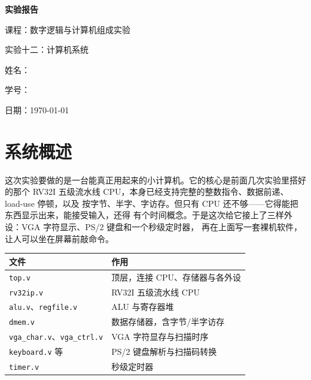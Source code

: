 \documentclass[12pt, a4paper]{ctexart}
\begin{document}
\begin{titlepage}
    \centering
    \vspace*{5cm}
    {\Huge\bfseries 实验报告\par}
    \vspace{2cm}
    {\Large 课程：数字逻辑与计算机组成实验\par}
    \vspace{1cm}
    {\Large 实验十二：计算机系统\par}
    \vspace{4cm}
    {\large 姓名：\underline{}\par}
    \vspace{1cm}
    {\large 学号：\underline{}\par}
    \vspace{1cm}
    {\large 日期：\today\par}
\end{titlepage}

\tableofcontents
\newpage

\section{系统概述}

这次实验要做的是一台能真正用起来的小计算机。它的核心是前面几次实验里搭好的那个
RV32I 五级流水线 CPU，本身已经支持完整的整数指令、数据前递、load-use 停顿，以及
按字节、半字、字访存。但只有 CPU 还不够——它得能把东西显示出来，能接受输入，还得
有个时间概念。于是这次给它接上了三样外设：VGA 字符显示、PS/2 键盘和一个秒级定时器，
再在上面写一套裸机软件，让人可以坐在屏幕前敲命令。

\begin{table}[h]
\centering
\begin{tabular}{ll}
\toprule
文件 & 作用 \\
\midrule
\lstinline|top.v| & 顶层，连接 CPU、存储器与各外设 \\
\lstinline|rv32ip.v| & RV32I 五级流水线 CPU \\
\lstinline|alu.v|、\lstinline|regfile.v| & ALU 与寄存器堆 \\
\lstinline|dmem.v| & 数据存储器，含字节/半字访存 \\
\lstinline|vga_char.v|、\lstinline|vga_ctrl.v| & VGA 字符显存与扫描时序 \\
\lstinline|keyboard.v| 等 & PS/2 键盘解析与扫描码转换 \\
\lstinline|timer.v| & 秒级定时器 \\
\bottomrule
\end{tabular}
\end{table}
\end{document}
